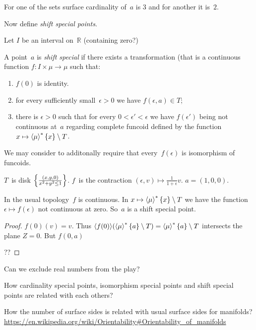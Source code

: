 For one of the sets surface cardinality of~$a$ is $3$ and for
another it is~$2$.

Now define \emph{shift special points}.

Let $I$ be an interval on~$\mathbb{R}$ (containing zero?)

A point~$a$ is \emph{shift special} if there exists a transformation
(that is a continuous function $f:I\times\mu\to\mu$ such that:
\begin{enumerate}
  \item $f(0)$ is identity. 
  \item for every sufficiently small~$\epsilon>0$ we have $f(\epsilon,a)\in T$;
  \item there is $\epsilon>0$ such that for every $0<\epsilon'<\epsilon$ we have
    $f(\epsilon')$ being not continuous at~$a$ regarding complete funcoid
    defined by the function $x\mapsto\left\langle \mu\right\rangle ^{\ast}\{x\}\setminus T$.
\end{enumerate}

We may consider to additonally require that every~$f(\epsilon)$ is isomorphism
of funcoids.

\begin{example}
$T$~is disk $\left\{ \frac{(x,y,0)}{x^2+y^2\leq 1}\right\}$. $f$~is the contraction
$(\epsilon,v)\mapsto\frac{1}{1+\epsilon}v$. $a=(1,0,0)$.

In the usual topology~$f$ is continuous. In
$x\mapsto\left\langle \mu\right\rangle ^{\ast}\{x\}\setminus T$ we have the function
$\epsilon\mapsto f(\epsilon)$ not continuous at zero.
So~$a$ is a shift special point.
\end{example}

\begin{proof}
$f (0) (v) = v$. Thus $\langle f (0) \rangle (\left\langle \mu\right\rangle ^{\ast} \{ a
\} \setminus T) = \left\langle \mu\right\rangle ^{\ast} \{ a \} \setminus T$ intersects
the plane $Z = 0$. But $f (0, a)$

??
\end{proof}

\begin{question}
Can we exclude real numbers from the play?
\end{question}

\begin{question}
How cardinality special points, isomorphism special points and shift
special points are related with each others?
\end{question}

\begin{question}
How the number of surface sides is related with usual surface sides for
manifolds?
\url{https://en.wikipedia.org/wiki/Orientability#Orientability_of_manifolds}
\end{question}

